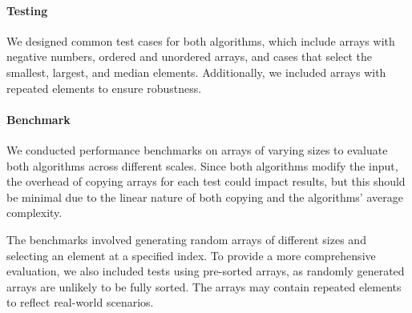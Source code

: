 \documentclass[paper=a4, fontsize=12pt]{scrartcl}
\numberwithin{equation}{section}
\numberwithin{figure}{section}
\numberwithin{table}{section}
\begin{document}
    \paragraph{Testing}
    We designed common test cases for both algorithms, which include arrays with negative numbers, ordered and unordered arrays, and cases that select the smallest, largest, and median elements.
    Additionally, we included arrays with repeated elements to ensure robustness.

    \paragraph{Benchmark}
    We conducted performance benchmarks on arrays of varying sizes to evaluate both algorithms across different scales. 
    Since both algorithms modify the input, the overhead of copying arrays for each test could impact results, but this should be minimal due to the linear nature of both copying and the algorithms' average complexity.

    The benchmarks involved generating random arrays of different sizes and selecting an element at a specified index. 
    To provide a more comprehensive evaluation, we also included tests using pre-sorted arrays, as randomly generated arrays are unlikely to be fully sorted. 
    The arrays may contain repeated elements to reflect real-world scenarios.
\end{document}

